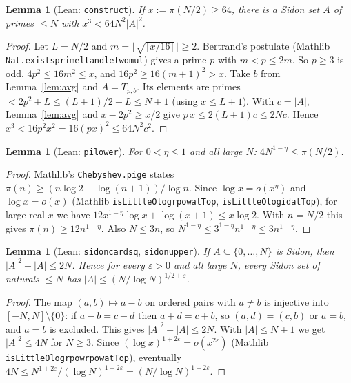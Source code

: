 \documentclass[11pt]{article}
\newtheorem{lemma}[theorem]{Lemma}
\theoremstyle{definition}
\theoremstyle{remark}
\renewcommand{\_}{\oldus\allowbreak}
\begin{document}
\begin{lemma}[Lean: \texttt{construct}]\label{lem:construct}
If $x:=\pi(N/2)\ge 64$, there is a Sidon set $A$ of primes $\le N$ with $x^3<64N^2|A|^2$.
\end{lemma}
\begin{proof}
Let $L=N/2$ and $m=\lfloor\sqrt{\lfloor x/16\rfloor}\rfloor\ge 2$. Bertrand's postulate (Mathlib
\texttt{Nat.exists\_prime\_lt\_and\_le\_two\_mul}) gives a prime $p$ with $m<p\le 2m$. So $p\ge3$ is odd,
$4p^2\le 16m^2\le x$, and $16p^2\ge16(m+1)^2>x$. Take $b$ from Lemma~\ref{lem:avg} and $A=T_{p,b}$. Its
elements are primes $<2p^2+L\le (L+1)/2+L\le N+1$ (using $x\le L+1$). With $c=|A|$, Lemma~\ref{lem:avg} and
$x-2p^2\ge x/2$ give $p\,x\le 2(L+1)c\le 2Nc$. Hence $x^3<16p^2x^2=16(px)^2\le 64N^2c^2$.
\end{proof}

\begin{lemma}[Lean: \texttt{pi\_lower}]\label{lem:cheb}
For $0<\eta\le1$ and all large $N$: $4N^{1-\eta}\le\pi(N/2)$.
\end{lemma}
\begin{proof}
Mathlib's \texttt{Chebyshev.pi\_ge} states $\pi(n)\ge (n\log2-\log(n+1))/\log n$. Since $\log x=o(x^{\eta})$
and $\log x=o(x)$ (Mathlib \texttt{isLittleO\_log\_rpow\_atTop}, \texttt{isLittleO\_log\_id\_atTop}), for large real
$x$ we have $12x^{1-\eta}\log x+\log(x+1)\le x\log2$. With $n=N/2$ this gives $\pi(n)\ge12n^{1-\eta}$. Also
$N\le 3n$, so $N^{1-\eta}\le 3^{1-\eta}n^{1-\eta}\le 3n^{1-\eta}$.
\end{proof}

\begin{lemma}[Lean: \texttt{sidon\_card\_sq}, \texttt{sidon\_upper}]\label{lem:upper}
If $A\subseteq\{0,\dots,N\}$ is Sidon, then $|A|^2-|A|\le 2N$. Hence for every $\varepsilon>0$ and all large
$N$, every Sidon set of naturals $\le N$ has $|A|\le (N/\log N)^{1/2+\varepsilon}$.
\end{lemma}
\begin{proof}
The map $(a,b)\mapsto a-b$ on ordered pairs with $a\ne b$ is injective into $[-N,N]\setminus\{0\}$: if
$a-b=c-d$ then $a+d=c+b$, so $(a,d)=(c,b)$ or $a=b$, and $a=b$ is excluded. This gives $|A|^2-|A|\le 2N$.
With $|A|\le N+1$ we get $|A|^2\le4N$ for $N\ge3$. Since $(\log x)^{1+2\varepsilon}=o(x^{2\varepsilon})$
(Mathlib \texttt{isLittleO\_log\_rpow\_rpow\_atTop}), eventually
$4N\le N^{1+2\varepsilon}/(\log N)^{1+2\varepsilon}=(N/\log N)^{1+2\varepsilon}$.
\end{proof}
\end{document}

